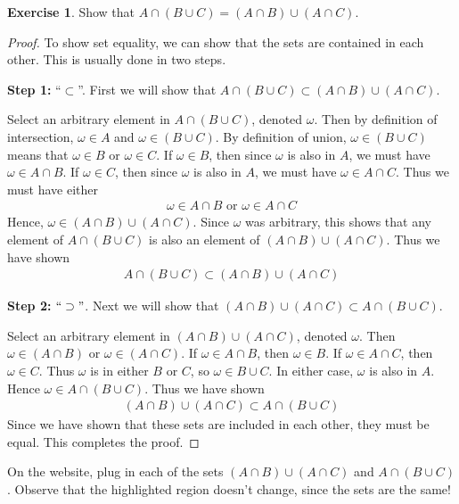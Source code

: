\documentclass{tufte-book}
\theoremstyle{definition}
\numberwithin{theorem}{section}
\numberwithin{definition}{section}
\numberwithin{lemma}{section}
\numberwithin{corollary}{section}
\numberwithin{proposition}{section}
\numberwithin{remark}{section}
\numberwithin{claim}{section}
\numberwithin{observation}{section}
\numberwithin{fact}{section}
\numberwithin{assumption}{section}
\numberwithin{example}{section}
\newtheorem{exercise}[theorem]{Exercise}
\numberwithin{exercise}{section}
\begin{document}
\begin{exercise}
Show that $A \cap (B \cup C) = (A \cap B) \cup (A \cap C)$.
\end{exercise}
\begin{proof}
To show set equality, we can show that the sets are contained in each other. This is usually done in two steps. 

\textbf{Step 1:} ``$\subset$''. First we will show that $A \cap (B \cup C) \subset (A \cap B) \cup (A \cap C)$. 

Select an arbitrary element in $A \cap (B \cup C)$, denoted $\omega$. Then by definition of intersection, $\omega \in A$ and $\omega \in (B \cup C)$. By definition of union, $\omega \in (B \cup C)$ means that $\omega \in B$ or $\omega \in C$. If $\omega \in B$, then since $\omega$ is also in $A$, we must have $\omega \in A \cap B$. If $\omega \in C$, then since $\omega$ is also in $A$, we must have $\omega \in A \cap C$. Thus we must have either
\begin{align*}
\omega \in A \cap B \text{ or } \omega \in A\cap C
\end{align*}
Hence, $\omega \in (A \cap B) \cup (A \cap C)$. Since $\omega$ was arbitrary, this shows that any element of $A \cap (B \cup C)$ is also an element of $(A \cap B) \cup (A \cap C)$. Thus we have shown
\begin{align*}
A \cap (B \cup C) \subset (A \cap B) \cup (A \cap C)
\end{align*}

\textbf{Step 2:} $``\supset"$. Next we will show that $(A \cap B) \cup (A \cap C) \subset A \cap (B \cup C)$.

Select an arbitrary element in $(A \cap B) \cup (A \cap C)$, denoted $\omega$. Then $\omega \in (A \cap B)$ or $\omega \in (A \cap C)$. If $\omega \in A \cap B$, then $\omega \in B$. If $\omega \in A \cap C$, then $\omega \in C$. Thus $\omega$ is in either $B$ or $C$, so $\omega \in B \cup C$. In either case, $\omega$ is also in $A$. Hence $\omega \in A \cap (B \cup C)$. Thus we have shown
\begin{align*}
(A \cap B) \cup (A \cap C) \subset A \cap (B \cup C)
\end{align*}
Since we have shown that these sets are included in each other, they must be equal. This completes the proof.
\end{proof}

On the website, plug in each of the sets $(A \cap B) \cup (A \cap C)$ and $A \cap (B \cup C)$. Observe that the highlighted region doesn't change, since the sets are the same!
\end{document}
